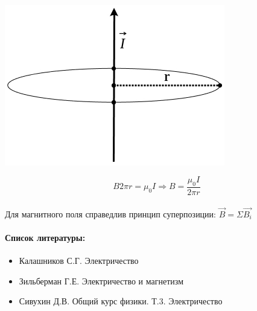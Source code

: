 \documentclass[dvipdfmx]{article}
\begin{document}
\paragraph{}
\begin{minipage}{0.4\linewidth}
  \includegraphics[width=\linewidth,natwidth=364,natheight=266]{images/4.jpg}
\end{minipage}
\begin{minipage}{0.5\linewidth}
  \begin{equation*}
    B2\pi r = \mu_0I \Rightarrow B = \frac{\mu_0I}{2\pi r}
  \end{equation*}
\end{minipage}

\paragraph{}

Для магнитного поля справедлив принцип суперпозиции: $\vec{B} = \Sigma\vec{B_i}$

\paragraph{Список литературы:}

\begin{itemize}
\item
  Калашников С.Г. Электричество
\item
  Зильберман Г.Е. Электричество и магнетизм
\item
  Сивухин Д.В. Общий курс физики. Т.3. Электричество
\end{itemize}
\end{document}
